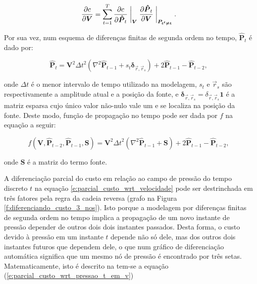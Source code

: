   \begin{equation} \label{e:parcial_custo_wrt_velocidade}
    \frac{\partial c}{\partial \boldsymbol{V}} =
      \sum \limits_{t=1}^T
      \frac{\partial c}{\partial \boldsymbol{\hat{P}}_t} \biggm\lvert_{\boldsymbol{V}}
      \frac{\partial \boldsymbol{\hat{P}}_t}{\partial \boldsymbol{V}} \biggm\lvert_{\boldsymbol{P_{t'\ne t}}}
    .
  \end{equation}

  Por sua vez, num esquema de diferenças finitas de segunda ordem no tempo, $\boldsymbol{\hat{P}}_t$ é dado por:

  \begin{equation} \label{e:fdm_rnn_cell}
    \boldsymbol{\hat{P}}_t =
      \boldsymbol{V}^2 {\Delta t}^2
      (\nabla^2 \boldsymbol{\hat{P}}_{t-1} + s_{t} \boldsymbol{\delta}_{\vec{r}, \vec{r}_s}) +
      2 \boldsymbol{\hat{P}}_{t-1} - 
      \boldsymbol{\hat{P}}_{t-2}
    ,
  \end{equation}

  \noindent onde $\Delta t$ é o menor intervalo de tempo utilizado na modelagem, $s_t$ e $\vec{r}_s$ são respectivamente a amplitude atual e a posição da fonte, e $\boldsymbol{\delta}_{\vec{r}, \vec{r}_s} = \delta_{\vec{r}, \vec{r}_s} \boldsymbol{1}$ é a matriz esparsa cujo único valor não-nulo vale um e se localiza na posição da fonte. Deste modo, função de propagação no tempo pode ser dada por $f$ na equação a seguir:

  \begin{equation} \label{e:fdm_rnn_cell_funcao}
    f(\boldsymbol{V}, \boldsymbol{\hat{P}}_{t-2}, \boldsymbol{\hat{P}}_{t-1}, \boldsymbol{S}) =
      \boldsymbol{V}^2 {\Delta t}^2
      (\nabla^2 \boldsymbol{\hat{P}}_{t-1} + \boldsymbol{S}) +
      2 \boldsymbol{\hat{P}}_{t-1} - 
      \boldsymbol{\hat{P}}_{t-2}
    ,
  \end{equation}

  \noindent onde $\boldsymbol{S}$ é a matriz do termo fonte.

  A diferenciação parcial do custo em relação ao campo de pressão do tempo discreto $t$ na equação \ref{e:parcial_custo_wrt_velocidade} pode ser destrinchada em três fatores pela regra da cadeia reversa (grafo na Figura \ref{f:diferenciando_custo_3_nos}). Isto porque a modelagem por diferenças finitas de segunda ordem no tempo implica a propagação de um novo instante de pressão depender de outros dois dois instantes passados. Desta forma, o custo devido à pressão em um instante $t$ depende não só dele, mas dos outros dois instantes futuros que dependem dele, o que num gráfico de diferenciação automática significa que um mesmo nó de pressão é encontrado por três setas. Matematicamente, isto é descrito na tem-se a equação (\ref{e:parcial_custo_wrt_pressao_t_em_v})


